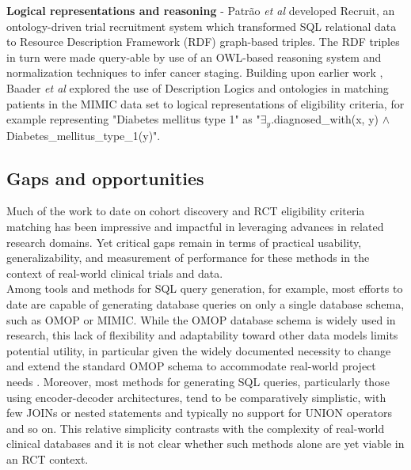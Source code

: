 \documentclass[../main.tex]{subfiles}
\begin{document}
\noindent \textbf{Logical representations and reasoning} - Patr{\~a}o \textit{et al} developed Recruit, an ontology-driven trial recruitment system which transformed SQL relational data to Resource Description Framework (RDF) graph-based triples. The RDF triples in turn were made query-able by use of an OWL-based reasoning system \cite{owl} and normalization techniques to infer cancer staging. Building upon earlier work \cite{patel2007matching, huang2013semanticct}, Baader \textit{et al} \cite{baader2018patient} explored the use of Description Logics and ontologies in matching patients in the MIMIC data set \cite{johnson2016mimic} to logical representations of eligibility criteria, for example representing "Diabetes mellitus type 1" as "$\exists_y$.diagnosed\_with(x, y) $\wedge$ Diabetes\_mellitus\_type\_1(y)".

\subsection*{Gaps and opportunities}

\noindent Much of the work to date on cohort discovery and RCT eligibility criteria matching has been impressive and impactful in leveraging advances in related research domains. Yet critical gaps remain in terms of practical usability, generalizability, and measurement of performance for these methods in the context of real-world clinical trials and data. \\

\noindent Among tools and methods for SQL query generation, for example, most efforts to date are capable of generating database queries on only a single database schema, such as OMOP or MIMIC. While the OMOP database schema is widely used in research, this lack of flexibility and adaptability toward other data models limits potential utility, in particular given the widely documented necessity to change and extend the standard OMOP schema to accommodate real-world project needs \cite{belenkaya2021extending, peng2021towards, zoch2021adaption, warner2019hemonc, zhou2013evaluation, shin2019genomic, kwon2019development}. Moreover, most methods for generating SQL queries, particularly those using encoder-decoder architectures, tend to be comparatively simplistic, with few JOINs or nested statements and typically no support for UNION operators and so on. This relative simplicity contrasts with the complexity of real-world clinical databases and it is not clear whether such methods alone are yet viable in an RCT context. \\
\end{document}
